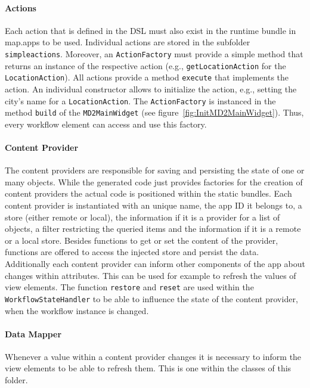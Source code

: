 \paragraph{Actions}
Each action that is defined in the \MD DSL must also exist in the \MD runtime bundle in map.apps to be used. Individual actions are stored in the subfolder \lstinline!simpleactions!. Moreover, an \lstinline!ActionFactory! must provide a simple method that returns an instance of the respective action (e.g., \lstinline!getLocationAction! for the \lstinline!LocationAction!). All actions provide a method \lstinline!execute! that implements the action. An individual constructor allows to initialize the action, e.g., setting the city's name for a \lstinline!LocationAction!. The \lstinline!ActionFactory! is instanced in the method \lstinline!build! of the \lstinline!MD2MainWidget! (see figure~\ref{fig:InitMD2MainWidget}). Thus, every workflow element can access and use this factory.

\paragraph{Content Provider}
The content providers are responsible for saving and persisting the state of one or many objects. While the generated code just provides factories for the creation of content providers the actual code is positioned within the static bundles. Each content provider is instantiated with an unique name, the app ID it belongs to, a store (either remote or local), the information if it is a provider for a list of objects, a filter restricting the queried items and the information if it is a remote or a local store.
Besides functions to get or set the content of the provider, functions are offered to access the injected store and persist the data.
Additionally each content provider can inform other components of the app about changes within attributes. This can be used for example to refresh the values of view elements.
The function \lstinline|restore| and \lstinline|reset| are used within the \lstinline|WorkflowStateHandler| to be able to influence the state of the content provider, when the workflow instance is changed.

\paragraph{Data Mapper}
Whenever a value within a content provider changes it is necessary to inform the view elements to be able to refresh them. This is one within the classes of this folder.

